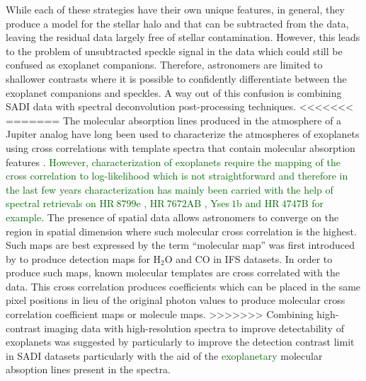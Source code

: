 \documentclass{aa}
\newcommand{\newchange}[1]{\textcolor{darkgreen}{#1}}
\begin{document}
{While each of these strategies have their own unique features, in general, they produce a model for the stellar halo and that can be subtracted from the data, leaving the residual data largely free of stellar contamination.
However, this leads to the problem of unsubtracted speckle signal in the data which could still be confused as exoplanet companions.
Therefore, astronomers are limited to shallower contrasts where it is possible to confidently differentiate between the exoplanet companions and speckles.
A way out of this confusion is combining SADI data with spectral deconvolution post-processing techniques\cite[as for e.g. in, ][]{2002SparksSDI, 2007ThatteSDI}.
<<<<<<<
=======
The molecular absorption lines produced in the atmosphere of a Jupiter analog have long been used to characterize the atmospheres of exoplanets using cross correlations with template spectra \cite[e.g][]{birkby2013detection,snellen2010orbital} that contain molecular absorption features \citep[e.g][]{2003BTsettl}.
\newchange{However, characterization of exoplanets require the mapping of the cross correlation to log-likelihood which is not straightforward and therefore in the last few years characterization has mainly been carried with the help of spectral retrievals on HR$~8799$e \citep[][]{2020MolliereHR8799e}, HR$~7672$AB \citep[][]{2022WangHR7672AB}, Yses$~1$b \citep[][]{2022Zhang} and HR$~4747$B \citep[][]{2022Xuan4747B} for example.}
The presence of spatial data allows astronomers to converge on the region in spatial dimension where such molecular cross correlation is the highest.
Such maps are best expressed by the term ``molecular map'' was first introduced by \citet{2018AHoeijmakersMM} to produce detection maps for \rm{H$_2$O} and \rm{CO} in IFS datasets.
In order to produce such maps, known molecular templates are cross correlated with the data.
This cross correlation produces coefficients which can be placed in the same pixel positions in lieu of the original photon values to produce molecular cross correlation coefficient maps or molecule maps.
>>>>>>>
Combining high-contrast imaging data with high-resolution spectra to improve detectability of exoplanets was suggested by\cite{2015Snellen} particularly to improve the detection contrast limit in SADI datasets particularly with the aid of the \newchange{exoplanetary} molecular absoption lines present in the spectra.

}
\end{document}

